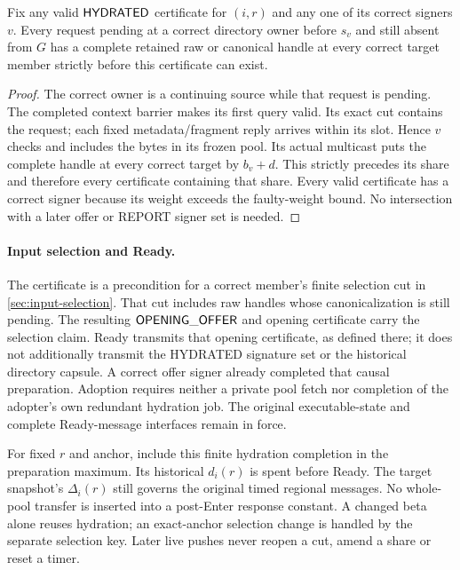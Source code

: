 \begin{proposition}
\label{prop:ownership-hydration}
Fix any valid $\mathsf{HYDRATED}$ certificate for $(i,r)$ and any one
of its correct signers $v$. Every request pending at a correct
directory owner before $s_v$ and still absent from $G$ has a complete
retained raw or canonical handle at every correct target member
strictly before this certificate can exist.
\end{proposition}
\begin{proof}
The correct owner is a continuing source while that request is pending.
The completed context barrier makes its first query valid. Its exact
cut contains the request; each fixed metadata/fragment reply arrives
within its slot. Hence $v$ checks and includes the bytes in its frozen
pool. Its actual multicast puts the complete handle at every correct
target by $b_v+d$. This strictly precedes its share and therefore every
certificate containing that share. Every valid certificate has a
correct signer because its weight exceeds the faulty-weight bound.
No intersection with a later offer or REPORT signer set is needed.
\end{proof}

\paragraph{Input selection and Ready.}
The certificate is a precondition for a correct member's finite
selection cut in \cref{sec:input-selection}. That cut includes raw
handles whose canonicalization is still pending. The resulting
$\mathsf{OPENING\_OFFER}$ and opening certificate carry the selection
claim. Ready transmits that opening certificate, as defined there;
it does not additionally transmit the HYDRATED signature set or the
historical directory capsule. A correct offer signer already completed
that causal preparation. Adoption requires neither a private pool
fetch nor completion of the adopter's own redundant hydration job.
The original executable-state and complete Ready-message interfaces
remain in force.

For fixed $r$ and anchor, include this finite hydration completion in
the preparation maximum. Its historical $d_i(r)$ is spent before
Ready. The target snapshot's $\Delta_i(r)$ still governs the original
timed regional messages. No whole-pool transfer is inserted into a
post-Enter response constant. A changed beta alone reuses hydration;
an exact-anchor selection change is handled by the separate selection
key. Later live pushes never reopen a cut, amend a share or reset a
timer.

